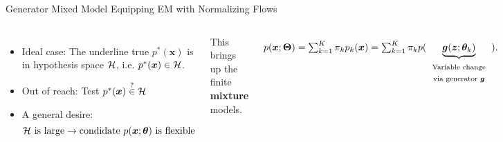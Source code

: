 \begin{frame}{Generator Mixed Model}
  {Equipping EM with Normalizing Flows}
  \begin{columns}
    \centering
    
    
    \centering
    \begin{minipage}{\linewidth}
      
      \begin{itemize}[label=\textbullet]
      \item Ideal case: The underline true $p^{\ast}(\bm{x})$ is in hypothesis space $\mathcal{H}$, i.e. $p^{\ast}(\bm{x}) \in \mathcal{H}$.
      \item Out of reach: Test $p^{\ast}(\bm{x}) \stackrel{?}{\in} \mathcal{H}$
      \item A general desire:
        \begin{equation*}
          \mathcal{H} ~\mathrm{is~large}  \rightarrow \mathrm{condidate}~ p(\bm{x};\bm{\theta})~\mathrm{is~flexible}
        \end{equation*}
        
      \end{itemize}
      
      This brings up the finite \textbf{mixture} models.

      \begin{align*}\label{eq:FirstMixtureModel}
        p(\bm{x};\bm{\Theta})  = \textstyle\sum_{k=1}^K \pi_k  p_k(\bm{x}) = \textstyle \sum_{k=1}^K \pi_k  p(\underbrace{\bm{g}(\bm{z};\bm{\theta}_k)}_{\text{\begin{tabular}{c}Variable change \\via generator $\bm{g}$\end{tabular}}}).
      \end{align*}
      

\end{minipage}
\end{columns}
\end{frame}
